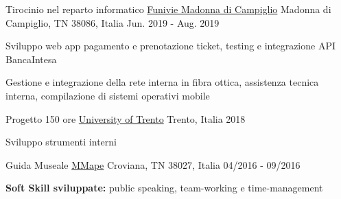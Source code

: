\begin{cventries}
\cventry
{Tirocinio nel reparto informatico} %
{\href{https://www.funiviecampiglio.it}{Funivie Madonna di Campiglio}} %
{Madonna di Campiglio, TN 38086, Italia} %
{Jun. 2019 - Aug. 2019} %
{
  \begin{cvitems} %
    \item {Sviluppo web app pagamento e prenotazione ticket, testing e integrazione API BancaIntesa}
    \item {Gestione e integrazione della rete interna in fibra ottica, assistenza tecnica interna, compilazione di sistemi operativi mobile}
  \end{cvitems}
  }

  \cventry
{Progetto 150 ore} %
{\href{https://www.unitn.it}{University of Trento}} %
{Trento, Italia} %
{2018} %
{
  \begin{cvitems} %
    \item {Sviluppo strumenti interni}
  \end{cvitems}
  }


\cventry
{Guida Museale} %
{\href{https://www.mmape.it}{MMape}} %
{Croviana, TN 38027, Italia} %
{04/2016 - 09/2016} %
{
  \begin{cvitems} %
    \item {\textbf{Soft Skill sviluppate:} public speaking, team-working e time-management}
  \end{cvitems}
}



\end{cventries}
